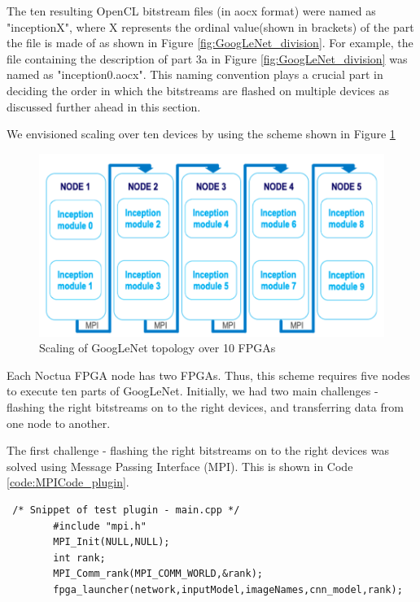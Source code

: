 The ten resulting OpenCL bitstream files (in aocx format) were named as "inceptionX", where X represents the ordinal value(shown in brackets) of the part the file is made of as shown in Figure \ref{fig:GoogLeNet_division}. For example, the file containing the description of part 3a in Figure \ref{fig:GoogLeNet_division} was named as "inception0.aocx". This naming convention plays a crucial part in deciding the order in which the bitstreams are flashed on multiple devices as discussed further ahead in this section.  

We envisioned scaling over ten devices by using the scheme shown in Figure \ref{fig:GoogLeNet_Scaling}

\begin{figure}[h!]
  \includegraphics[width=\textwidth,height=\textheight,keepaspectratio]{img/GoogLeNet_Scaling.png}
  \caption{Scaling of GoogLeNet topology over 10 FPGAs}
  \label{fig:GoogLeNet_Scaling}
\end{figure}

Each Noctua FPGA node has two FPGAs. Thus, this scheme requires five nodes to execute ten parts of GoogLeNet. Initially, we had two main challenges - flashing the right bitstreams on to the right devices, and transferring data from one node to another.

The first challenge - flashing the right bitstreams on to the right devices was solved using Message Passing Interface (MPI). This is shown in Code \ref{code:MPICode_plugin}.  


\begin{code}[!htb]
 \begin{verbatim}
 /* Snippet of test plugin - main.cpp */
        #include "mpi.h"
        MPI_Init(NULL,NULL);
        int rank;
        MPI_Comm_rank(MPI_COMM_WORLD,&rank);
        fpga_launcher(network,inputModel,imageNames,cnn_model,rank);
    
\end{verbatim}
\caption{testplugin/main.cpp}
\label{code:MPICode_plugin}
\end{code}

